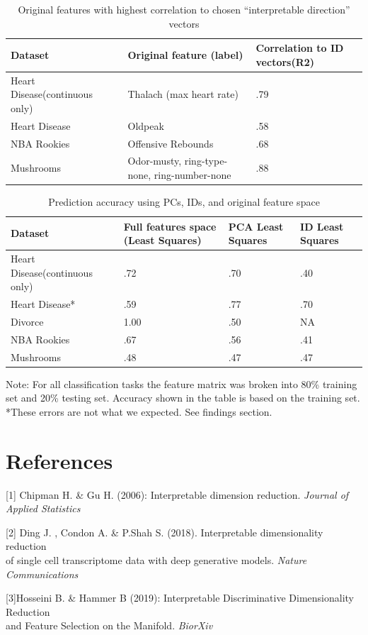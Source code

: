 \documentclass{article}
\begin{document}
\begin{table}
	\caption{Original features with highest correlation to chosen “interpretable direction” vectors }
	\centering
	\begin{tabular}{lll}
		\toprule
		\midrule
		Dataset     & Original feature (label)     & Correlation to ID vectors(R2) \\
		\midrule
		\midrule
		Heart Disease(continuous only) & Thalach (max heart rate) & .79     \\
		\midrule
		Heart Disease & Oldpeak & .58     \\
		\midrule
		NBA Rookies     & Offensive Rebounds   & .68 \\
		\midrule
		Mushrooms  & Odor-musty, ring-type-none, ring-number-none   & .88 \\
		\bottomrule
	\end{tabular}
\end{table}


\begin{table}
	\caption{ Prediction accuracy using PCs, IDs, and original feature space}
	\centering
	
	\begin{tabular}{llll}
		\toprule
		\midrule	
		Dataset     & Full features space (Least Squares) & PCA Least Squares & ID Least Squares \\
		\midrule
		\midrule
		Heart Disease(continuous only) & .72 & .70 & .40    \\
		\midrule
		Heart Disease*  & .59 & .77 & .70    \\
		\midrule
		Divorce     & 1.00 & .50 & NA  \\
		\midrule
		NBA Rookies   & .67 & .56 & .41    \\
		\midrule
		Mushrooms     & .48 & .47 & .47    \\
		\bottomrule
	\end{tabular}
Note: For all classification tasks the feature matrix was broken into 80\% training set and 20\% testing set. 
Accuracy shown in the table is based on the training set.
*These errors are not what we expected. See findings section.
\end{table}




\section{References}\label{sec_ref}

[1] Chipman H. \& Gu H. (2006): Interpretable dimension reduction. 
{\it Journal of Applied Statistics}

[2] Ding J. , Condon A. \& P.Shah S. (2018). Interpretable dimensionality reduction \\ of single cell transcriptome data with deep generative models. 
{\it Nature Communications}

[3]Hosseini B. \& Hammer B (2019): Interpretable Discriminative Dimensionality Reduction \\ and Feature Selection on the Manifold.
{\it BiorXiv}
\end{document}
